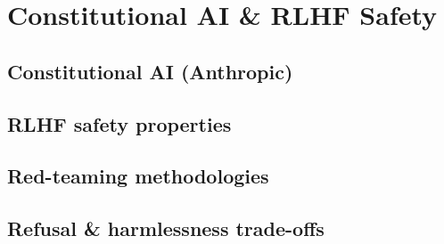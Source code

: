 
\section{Constitutional AI \& RLHF Safety}

\subsection{Constitutional AI (Anthropic)}


\subsection{RLHF safety properties}


\subsection{Red-teaming methodologies}


\subsection{Refusal \& harmlessness trade-offs}


